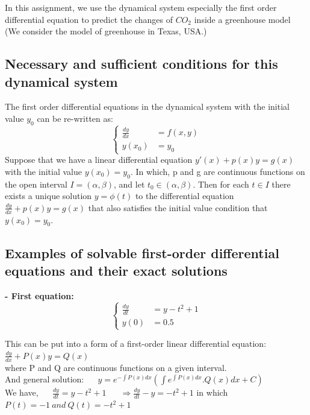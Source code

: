 \documentclass[a4paper]{article}
\numberwithin{equation}{section}
\begin{document}
In this assignment, we use the dynamical system especially the first order differential equation to predict the changes of $CO_2$ inside a greenhouse model (We consider the model of greenhouse in Texas, USA.) 

\subsection{Necessary and sufficient conditions for this dynamical system}
The first order differential equations in the dynamical system with the initial value $y_0$ can be re-written as: 
\begin{equation*}
  \begin{cases}
    \frac{dy}{dx} & = f(x,y) \\
    y(x_0)        & = y_0
  \end{cases}
\end{equation*}
Suppose that we have a linear differential equation $y'(x) + p(x)y = g(x)$ with the initial value $y(x_0) = y_0$. In which, p and g are continuous functions on the open interval $I = (\alpha,\beta)$, and let $t_0 \in (\alpha,\beta)$. Then for each $t \in I$ there exists a unique solution $y = \phi (t)$ to the differential equation $\frac{dy}{dx} + p(x)y = g(x)$ that also satisfies the initial value condition that $y(x_0) = y_0$.

\subsection{Examples of solvable first-order differential equations and their exact solutions}
\textbf{- First equation:}
\begin{equation*}
  \begin{cases}
    \frac{dy}{dt} & = y - t^2 +1 \\
    y(0)          & = 0.5
  \end{cases}
\end{equation*}

This can be put into a form of a first-order linear differential equation: \(\frac{dy}{dx} +P(x)y  = Q(x)\)\\
where P and Q are continuous functions on a given interval.\\

And general solution: ~~ \( y = e^{-\int P(x)dx}(\int e^{\int P(x)dx}.Q(x) dx +C) \)\\

We have, ~~ $\frac{dy}{dt} = y-t^2+1$ ~~ $ \Rightarrow \frac{dy}{dt} -y = -t^2+1 $ in which \( P(t)=-1~ and~ Q(t)=-t^2+1 \)
\end{document}
